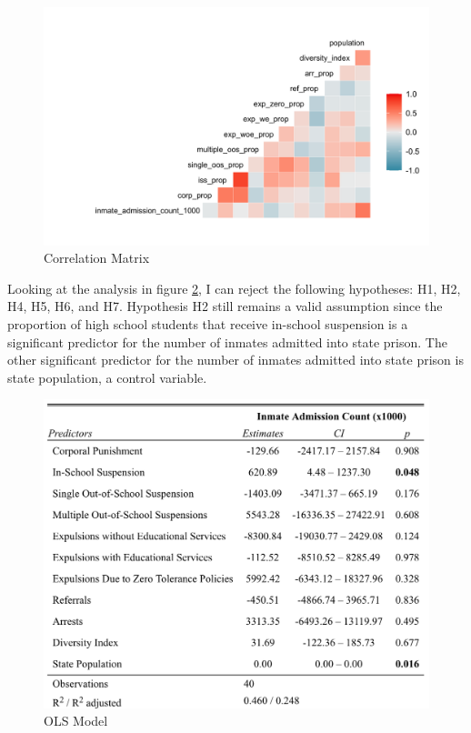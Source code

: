 \documentclass[12pt]{article}
\begin{document}
\begin{figure}[H]
  \centering
  \includegraphics[width = 17cm]{corMatrix.png}
  \caption{Correlation Matrix}
  \label{fig:corr}
\end{figure}

Looking at the analysis in figure \ref{fig:ols}, I can reject the following hypotheses: H1, H2, H4, H5, H6, and H7. Hypothesis H2 still remains a valid assumption since the proportion of high school students that receive in-school suspension is a significant predictor for the number of inmates admitted into state prison. The other significant predictor for the number of inmates admitted into state prison is state population, a control variable.

\begin{figure}[H]
  \centering
  \includegraphics[width = 17cm]{ols.png}
  \caption{OLS Model}
  \label{fig:ols}
\end{figure}
\end{document}
